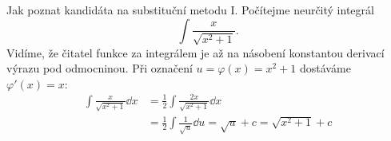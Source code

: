 \begin{mdframed}[style=mdexam]
  \begin{example}\label{MAI:exam110}
    Jak poznat kandidáta na substituční metodu I. Počítejme neurčitý integrál 
    \begin{equation*}
      \int\frac{x}{\sqrt{x^2+1}}.
    \end{equation*} 
    Vidíme, že čitatel funkce za integrálem je až na násobení konstantou derivací výrazu pod
    odmocninou. Při označení \(u=\varphi(x) = x^2 + 1\) dostáváme \(\varphi'(x) = x\):
    \begin{align*}
      \int\frac{x}{\sqrt{x^2+1}}\dd{x} 
        &= \frac{1}{2}\int\frac{2x}{\sqrt{x^2+1}}\dd{x} \\
        &= \frac{1}{2}\int\frac{1}{\sqrt{u}}\dd{u}         
        = \sqrt{u} + c = \sqrt{x^2 + 1} + c  
    \end{align*}
  \end{example}
\end{mdframed}